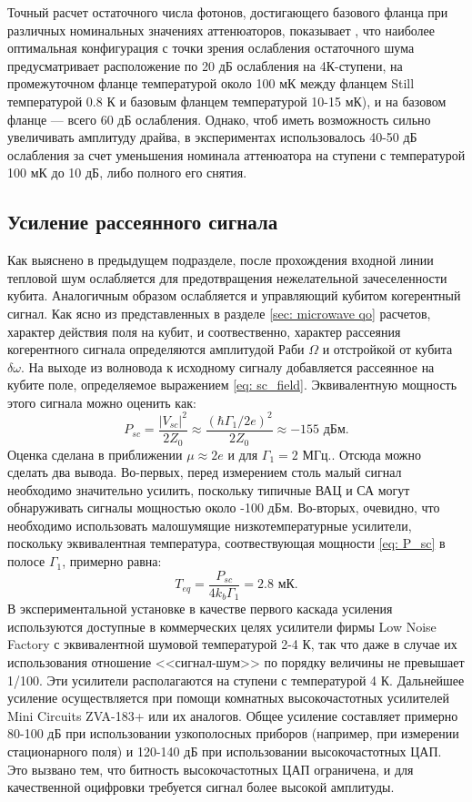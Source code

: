 Точный расчет остаточного числа фотонов, достигающего базового фланца при различных номинальных значениях аттенюаторов, показывает \cite{krinner2019engineering}, что наиболее оптимальная конфигурация с точки зрения ослабления остаточного шума предусматривает расположение по 20 дБ ослабления на 4К-ступени, на промежуточном фланце температурой около 100 мК между фланцем Still температурой 0.8 К и базовым фланцем температурой 10-15 мК), и на базовом фланце --- всего 60 дБ ослабления. Однако, чтоб иметь возможность сильно увеличивать амплитуду драйва, в экспериментах использовалось 40-50 дБ ослабления за счет уменьшения номинала аттенюатора на ступени с температурой 100 мК до 10 дБ, либо полного его снятия.

\subsection{Усиление рассеянного сигнала}
\label{sec: amplif}
Как выяснено в предыдущем подразделе, после прохождения входной линии тепловой шум  ослабляется для предотвращения нежелательной зачеселенности кубита. Аналогичным образом ослабляется и управляющий кубитом когерентный сигнал. Как ясно из представленных в разделе \ref{sec: microwave qo} расчетов, характер действия поля на кубит, и соотвественно, характер рассеяния когерентного сигнала определяются амплитудой Раби $\Omega$ и отстройкой от кубита $\delta\omega$. На выходе из волновода к исходному сигналу добавляется рассеянное на кубите поле, определяемое выражением \eqref{eq: sc_field}. Эквивалентную мощность этого сигнала можно оценить как:
\begin{equation}
P_{sc} = \frac{|V_{sc}|^2}{2Z_0} \approx \frac{(\hbar \Gamma_1/2e)^2}{2Z_0} \approx -155 \text{ дБм}.
\label{eq: P_sc}
\end{equation}
Оценка сделана в приближении $\mu\!\approx\!2e$ и для $\Gamma_1\!=\!2\text{ МГц.}$. Отсюда можно сделать два вывода. Во-первых, перед измерением столь малый сигнал необходимо значительно усилить, поскольку типичные ВАЦ и СА могут обнаруживать сигналы мощностью около -100 дБм. Во-вторых, очевидно, что необходимо использовать малошумящие низкотемпературные усилители, поскольку эквивалентная температура, соотвествующая мощности \eqref{eq: P_sc} в полосе $\Gamma_1$, примерно равна:
\begin{equation}
T_{eq} = \frac{P_{sc}}{4k_b\Gamma_1} = 2.8 \text{ мК}. 
\end{equation}
В экспериментальной установке в качестве первого каскада усиления используются доступные в коммерческих целях усилители фирмы Low Noise Factory с эквивалентной шумовой температурой 2-4 К, так что даже в случае их использования отношение <<сигнал-шум>> по порядку величины не превышает 1/100. Эти усилители располагаются на ступени с температурой 4 К. Дальнейшее усиление осуществляется при помощи комнатных высокочастотных усилителей Mini Circuits ZVA-183+ или их аналогов. Общее усиление составляет примерно 80-100 дБ при использовании узкополосных приборов (например, при измерении стационарного поля) и 120-140 дБ при использовании высокочастотных ЦАП. Это вызвано тем, что битность высокочастотных ЦАП ограничена, и для качественной оцифровки требуется сигнал более высокой амплитуды.

